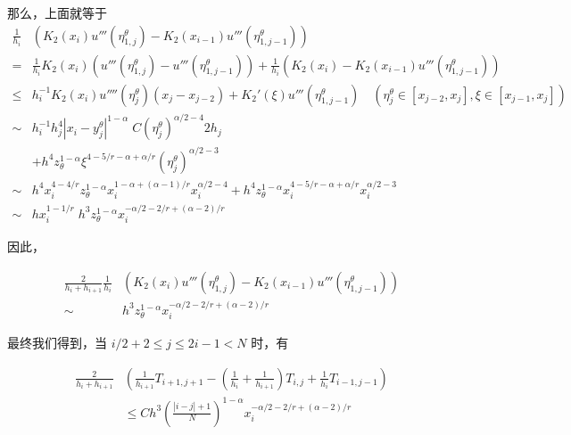 \documentclass{ctexart}
\begin{document}
那么，上面就等于
\begin{equation}
    \begin{aligned}
        \frac{1}{h_i} & (K_2(x_{i}) u'''(\eta_{1,j}^\theta) - K_2(x_{i-1}) u'''(\eta_{1,j-1}^\theta))    \\
        = &  \frac{1}{h_i} K_2(x_{i}) ( u'''(\eta_{1,j}^\theta) - u'''(\eta_{1,j-1}^\theta) ) + \frac{1}{h_i} (K_2(x_{i}) - K_2(x_{i-1}) u'''(\eta_{1,j-1}^\theta)) \\
        \le & h_i^{-1}K_2(x_i) u''''(\eta_{j}^\theta) (x_j-x_{j-2}) + K_2'(\xi)u'''(\eta_{1,j-1}^\theta)    \quad (\eta_j^\theta \in [x_{j-2}, x_{j}], \xi \in [x_{j-1}, x_{j}])\\
        \sim & h_i^{-1} h_j^4 |x_i-y_{j}^\theta|^{1-\alpha}\; C (\eta_{j}^\theta)^{\alpha/2-4} 2h_j \\
            & + h^4 z_\theta^{1-\alpha} \xi^{4-5/r-\alpha+\alpha/r} (\eta_{j}^\theta)^{\alpha/2-3} \\
        \sim & h^4 x_i^{4-4/r}z_\theta^{1-\alpha} x_i^{1-\alpha+(\alpha-1)/r} x_i^{\alpha/2-4} 
            + h^4 z_\theta^{1-\alpha} x_i^{4-5/r-\alpha+\alpha/r} x_i^{\alpha/2-3}      \\
        \sim & hx_i^{1-1/r} \; h^3 z_\theta^{1-\alpha} x_i^{-\alpha/2-2/r+(\alpha-2)/r} 
    \end{aligned}
\end{equation}


因此，

\begin{equation}
    \begin{aligned}
        \frac{2}{h_{i}+h_{i+1}} \frac{1}{h_i} & (K_2(x_{i}) u'''(\eta_{1,j}^\theta) - K_2(x_{i-1}) u'''(\eta_{1,j-1}^\theta))    \\
        \sim & h^3 z_\theta^{1-\alpha} x_i^{-\alpha/2-2/r+(\alpha-2)/r} 
    \end{aligned}
\end{equation}

最终我们得到，当 \(i/2+2\le j \le 2i-1 < N\) 时，有

\begin{equation}
    \begin{aligned}
        \frac{2}{h_i + h_{i+1}} & \left( \frac{1}{h_{i+1}} T_{i+1, j+1} - (\frac{1}{h_{i}}+\frac{1}{h_{i+1}}) T_{i,j}+  \frac{1}{h_{i}} T_{i-1, j-1} \right) \\
        & \le C h^3 \left(\frac{|i-j|+1}{N}\right)^{1-\alpha} x_i^{-\alpha/2-2/r+(\alpha-2)/r}
    \end{aligned}
\end{equation}
\end{document}
